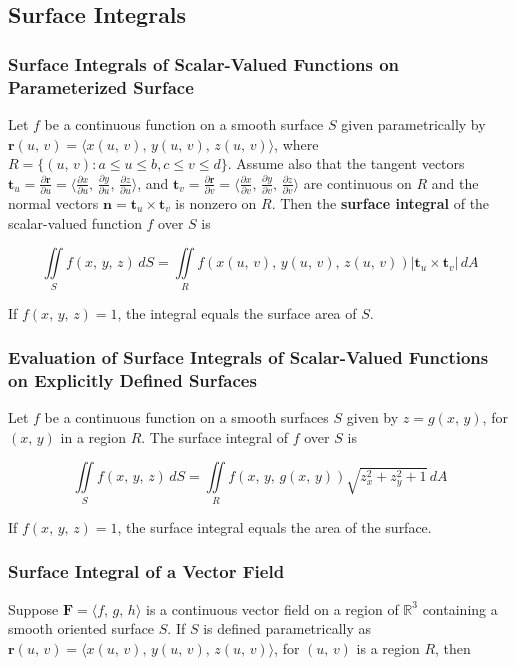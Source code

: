 \subsection{Surface Integrals}
\subsubsection{Surface Integrals of Scalar-Valued Functions on Parameterized Surface}
Let $f$ be a continuous function on a smooth surface $S$ given parametrically by $\mathbf{r}(u,\, v) = \langle x(u,\, v),\, y(u,\, v),\, z(u,\, v) \rangle$, where $R = \{ (u,\, v): a \leq u \leq b, c \leq v \leq d \}$. Assume also that the tangent vectors $\mathbf{t}_u  = \frac{\partial \mathbf{r}}{\partial u} = \langle \frac{\partial x}{\partial u},\, \frac{\partial y}{\partial u},\, \frac{\partial z}{\partial u} \rangle$, and $\mathbf{t}_v  = \frac{\partial \mathbf{r}}{\partial v} = \langle \frac{\partial x}{\partial v},\, \frac{\partial y}{\partial v},\, \frac{\partial z}{\partial v} \rangle$ are continuous on $R$ and the normal vectors $\mathbf{n} = \mathbf{t}_u \times \mathbf{t}_v$ is nonzero on $R$. Then the \textbf{surface integral} of the scalar-valued function $f$ over $S$ is

\begin{equation}
    \iint \limits _S f(x,\, y,\, z) \, dS = \iint \limits _R f(
    x(u,\, v),\,
    y(u,\, v),\,
    z(u,\, v)
    ) | \mathbf{t}_u \times \mathbf{t}_v | \, dA
\end{equation}

If $f(x,\, y,\, z) = 1$, the integral equals the surface area of $S$.

\subsubsection{Evaluation of Surface Integrals of Scalar-Valued Functions on Explicitly Defined Surfaces}
Let $f$ be a continuous function on a smooth surfaces $S$ given by $z = g(x,\, y)$, for $(x,\, y)$ in a region $R$. The surface integral of $f$ over $S$ is

\begin{equation}
    \iint \limits _S f(x,\, y,\, z) \, dS = \iint \limits _R f(x,\, y,\, g(x,\, y))\sqrt{z_x^2 + z _y^2 + 1} \, dA
\end{equation}

If $f(x,\, y,\, z) = 1$, the surface integral equals the area of the surface.

\subsubsection{Surface Integral of a Vector Field}
Suppose $\mathbf{F} = \langle f,\, g,\, h \rangle$ is a continuous vector field on a region of $\mathbb{R}^3$ containing a smooth oriented surface $S$. If $S$ is defined parametrically as $\mathbf{r}(u,\, v) = \langle x(u,\, v),\, y(u,\, v),\, z(u,\, v) \rangle$, for $(u,\, v)$ is a region $R$, then

